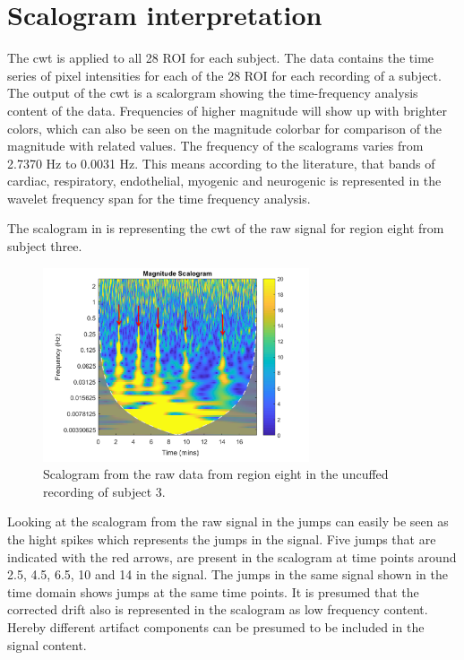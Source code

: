 \section{Scalogram interpretation}

The cwt is applied to all 28 ROI for each subject. The data contains the time series of pixel intensities for each of the 28 ROI for each recording of a subject.  
The output of the cwt is a scalorgram showing the time-frequency analysis content of the data. Frequencies of higher magnitude will show up with brighter colors, which can also be seen on the magnitude colorbar for comparison of the magnitude with related values.
The frequency of the scalograms varies from 2.7370 Hz to 0.0031 Hz. This means according to the literature, that bands of cardiac, respiratory, endothelial, myogenic and neurogenic is represented in the wavelet frequency span for the time frequency analysis. \cite{gayer2004, sagaidachnyi2014}

The scalogram in  is representing the cwt of the raw signal for region eight from subject three.

\begin{figure}[H]
	\includegraphics[width=0.7\textwidth]{figures/uncuffed_sub3_roi8_uncorr}
	\caption{Scalogram from the raw data from region eight in the uncuffed recording of subject 3.}
	\label{fig:scalogram_uncorr}
\end{figure}

Looking at the scalogram from the raw signal in  the jumps can easily be seen as the hight spikes which represents the jumps in the signal. Five jumps that are indicated with the red arrows, are present in the scalogram at time points around 2.5, 4.5, 6.5, 10 and 14 in the signal. The jumps in the same signal shown in the time domain shows jumps at the same time points. It is presumed that the corrected drift also is represented in the scalogram as low frequency content. Hereby different artifact components can be presumed to be included in the signal content. 

